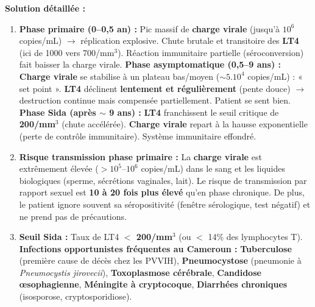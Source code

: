 \documentclass[11pt]{article}
\begin{document}
\begin{exoresolu}
\begin{enumerate}
\end{enumerate}
\tcblower
\textbf{Solution détaillée :}
\begin{enumerate}
    \item \textbf{Phase primaire (0--0,5 an) :} Pic massif de \textbf{charge virale} (jusqu'à $10^6$ copies/mL) $\rightarrow$ réplication explosive. Chute brutale et transitoire des \textbf{LT4} (ici de 1000 vers 700/mm$^3$). Réaction immunitaire partielle (séroconversion) fait baisser la charge virale.
    \textbf{Phase asymptomatique (0,5--9 ans) :} \textbf{Charge virale} se stabilise à un plateau bas/moyen ($\sim 5.10^4$ copies/mL) : « set point ». \textbf{LT4} déclinent \textbf{lentement et régulièrement} (pente douce) $\rightarrow$ destruction continue mais compensée partiellement. Patient se sent bien.
    \textbf{Phase Sida (après $\sim$ 9 ans) :} \textbf{LT4} franchissent le seuil critique de \textbf{200/mm$^3$} (chute accélérée). \textbf{Charge virale} repart à la hausse exponentielle (perte de contrôle immunitaire). Système immunitaire effondré.
    \item \textbf{Risque transmission phase primaire :} La \textbf{charge virale} est extrêmement élevée ($> 10^5$--$10^6$ copies/mL) dans le sang et les liquides biologiques (sperme, sécrétions vaginales, lait). Le risque de transmission par rapport sexuel est \textbf{10 à 20 fois plus élevé} qu'en phase chronique. De plus, le patient ignore souvent sa séropositivité (fenêtre sérologique, test négatif) et ne prend pas de précautions.
    \item \textbf{Seuil Sida :} Taux de LT4 \textbf{$<$ 200/mm$^3$} (ou $<$ 14\% des lymphocytes T). \textbf{Infections opportunistes fréquentes au Cameroun :} \textbf{Tuberculose} (première cause de décès chez les PVVIH), \textbf{Pneumocystose} (pneumonie à \emph{Pneumocystis jirovecii}), \textbf{Toxoplasmose cérébrale}, \textbf{Candidose œsophagienne}, \textbf{Méningite à cryptocoque}, \textbf{Diarrhées chroniques} (isosporose, cryptosporidiose).
\end{enumerate}
\end{exoresolu}
\end{document}
